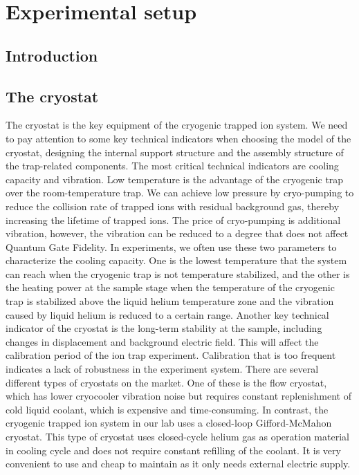 
\chapter{Experimental setup}

\section{Introduction}



\section{The cryostat}

The cryostat is the key equipment of the cryogenic trapped ion system. We need to pay attention to some key technical indicators when choosing the model of the cryostat, designing the internal support structure and the assembly structure of the trap-related components. The most critical technical indicators are cooling capacity and vibration. Low temperature is the advantage of the cryogenic trap over the room-temperature trap. We can achieve low pressure by cryo-pumping to reduce the collision rate of trapped ions with residual background gas, thereby increasing the lifetime of trapped ions. The price of cryo-pumping is additional vibration, however, the vibration can be reduced to a degree that does not affect Quantum Gate Fidelity. In experiments, we often use these two parameters to characterize the cooling capacity. One is the lowest temperature that the system can reach when the cryogenic trap is not temperature stabilized, and the other is the heating power at the sample stage when the temperature of the cryogenic trap is stabilized above the liquid helium temperature zone and the vibration caused by liquid helium is reduced to a certain range. Another key technical indicator of the cryostat is the long-term stability at the sample, including changes in displacement and background electric field. This will affect the calibration period of the ion trap experiment. Calibration that is too frequent indicates a lack of robustness in the experiment system.
There are several different types of cryostats on the market. One of these is the flow cryostat, which has lower cryocooler vibration noise but requires constant replenishment of cold liquid coolant, which is expensive and time-consuming. In contrast, the cryogenic trapped ion system in our lab uses a closed-loop Gifford-McMahon cryostat. This type of cryostat uses closed-cycle helium gas as operation material in cooling cycle and does not require constant refilling of the coolant. It is very convenient to use and cheap to maintain as it only needs external electric supply.
